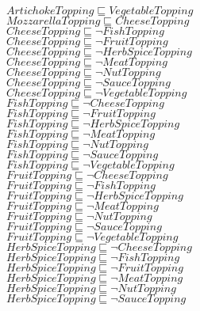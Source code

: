 \documentclass[a4paper,10pt]{article}
\begin{document}
 $ArtichokeTopping \sqsubseteq VegetableTopping$\\ 
 $MozzarellaTopping \sqsubseteq CheeseTopping$\\ 
 $CheeseTopping \sqsubseteq  \lnot FishTopping$\\ 
 $CheeseTopping \sqsubseteq  \lnot FruitTopping$\\ 
 $CheeseTopping \sqsubseteq  \lnot HerbSpiceTopping$\\ 
 $CheeseTopping \sqsubseteq  \lnot MeatTopping$\\ 
 $CheeseTopping \sqsubseteq  \lnot NutTopping$\\ 
 $CheeseTopping \sqsubseteq  \lnot SauceTopping$\\ 
 $CheeseTopping \sqsubseteq  \lnot VegetableTopping$\\ 
 $FishTopping \sqsubseteq  \lnot CheeseTopping$\\ 
 $FishTopping \sqsubseteq  \lnot FruitTopping$\\ 
 $FishTopping \sqsubseteq  \lnot HerbSpiceTopping$\\ 
 $FishTopping \sqsubseteq  \lnot MeatTopping$\\ 
 $FishTopping \sqsubseteq  \lnot NutTopping$\\ 
 $FishTopping \sqsubseteq  \lnot SauceTopping$\\ 
 $FishTopping \sqsubseteq  \lnot VegetableTopping$\\ 
 $FruitTopping \sqsubseteq  \lnot CheeseTopping$\\ 
 $FruitTopping \sqsubseteq  \lnot FishTopping$\\ 
 $FruitTopping \sqsubseteq  \lnot HerbSpiceTopping$\\ 
 $FruitTopping \sqsubseteq  \lnot MeatTopping$\\ 
 $FruitTopping \sqsubseteq  \lnot NutTopping$\\ 
 $FruitTopping \sqsubseteq  \lnot SauceTopping$\\ 
 $FruitTopping \sqsubseteq  \lnot VegetableTopping$\\ 
 $HerbSpiceTopping \sqsubseteq  \lnot CheeseTopping$\\ 
 $HerbSpiceTopping \sqsubseteq  \lnot FishTopping$\\ 
 $HerbSpiceTopping \sqsubseteq  \lnot FruitTopping$\\ 
 $HerbSpiceTopping \sqsubseteq  \lnot MeatTopping$\\ 
 $HerbSpiceTopping \sqsubseteq  \lnot NutTopping$\\ 
 $HerbSpiceTopping \sqsubseteq  \lnot SauceTopping$\\ 
\end{document}
